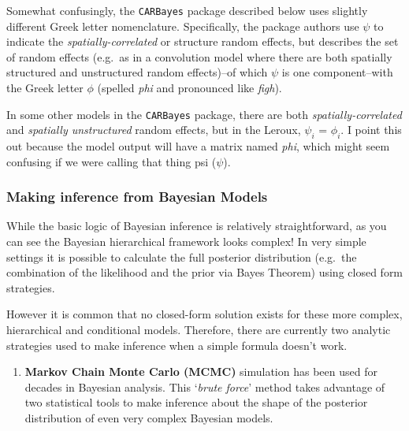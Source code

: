 \documentclass[
]{book}
\providecommand{\tightlist}{%
  \setlength{\itemsep}{0pt}\setlength{\parskip}{0pt}}
\newenvironment{rmdcaution}[1]
  {
  \begin{itemize}
  \renewcommand{\labelitemi}{
    \raisebox{-.7\height}[0pt][0pt]{
      {\setkeys{Gin}{width=3em,keepaspectratio}\texttt{[image: images/\#1]}}
    }
  }
  \setlength{\fboxsep}{1em}
  \begin{caution}
  \item
  }
  {
  \end{caution}
  \end{itemize}
  }
\begin{document}
\begin{rmdcaution}{caution}
Somewhat confusingly, the \texttt{CARBayes} package described below uses slightly different Greek letter nomenclature. Specifically, the package authors use \(\psi\) to indicate the \emph{spatially-correlated} or structure random effects, but describes the set of random effects (e.g.~as in a convolution model where there are both spatially structured and unstructured random effects)--of which \(\psi\) is one component--with the Greek letter \(\phi\) (spelled \emph{phi} and pronounced like \emph{figh}).

In some other models in the \texttt{CARBayes} package, there are both \emph{spatially-correlated} and \emph{spatially unstructured} random effects, but in the Leroux, \(\psi_i\) = \(\phi_i\). I point this out because the model output will have a matrix named \emph{phi}, which might seem confusing if we were calling that thing psi (\(\psi\)).

\end{rmdcaution}

\hypertarget{making-inference-from-bayesian-models}{%
\subsubsection{Making inference from Bayesian Models}\label{making-inference-from-bayesian-models}}

While the basic logic of Bayesian inference is relatively straightforward, as you can see the Bayesian hierarchical framework looks complex! In very simple settings it is possible to calculate the full posterior distribution (e.g.~the combination of the likelihood and the prior via Bayes Theorem) using closed form strategies.

However it is common that no closed-form solution exists for these more complex, hierarchical and conditional models. Therefore, there are currently two analytic strategies used to make inference when a simple formula doesn't work.

\begin{enumerate}
\def\labelenumi{\arabic{enumi}.}
\tightlist
\item
  \textbf{Markov Chain Monte Carlo (MCMC)} simulation has been used for decades in Bayesian analysis. This `\emph{brute force}' method takes advantage of two statistical tools to make inference about the shape of the posterior distribution of even very complex Bayesian models.
\end{enumerate}
\end{document}
